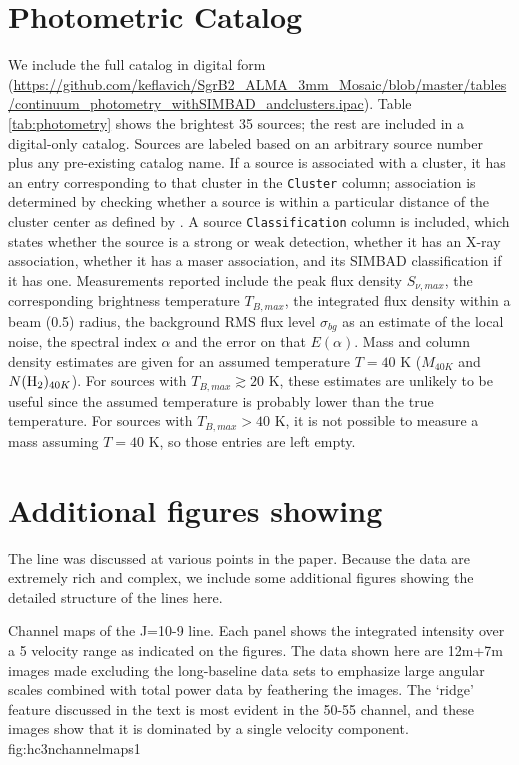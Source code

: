 \documentclass[twocolumn]{aastex61}
\begin{document}
\section{Photometric Catalog}
\label{sec:catalog}
We include the full catalog in digital form
(\url{https://github.com/keflavich/SgrB2_ALMA_3mm_Mosaic/blob/master/tables/continuum_photometry_withSIMBAD_andclusters.ipac}).
Table \ref{tab:photometry} shows
the brightest 35 sources; the rest are included in a digital-only catalog.
Sources are labeled based on an arbitrary source
number plus any pre-existing catalog name.  If a source is associated with a cluster,
it has an entry corresponding to that cluster in the \texttt{Cluster} column;
association is determined by checking whether a source is within a particular distance
of the cluster center as defined by \citet{Schmiedeke2016a}.  A source
\texttt{Classification} column is included, which states whether the source
is a strong or weak detection, whether it has an X-ray association, whether it
has a maser association, and its SIMBAD classification if it has one.
Measurements reported include the peak flux density $S_{\nu,max}$, the
corresponding brightness temperature $T_{B,max}$, the integrated flux density
within a beam (0.5\arcsec) radius, the background RMS flux level $\sigma_{bg}$
as an estimate of the local noise, the spectral index $\alpha$ and the error on
that $E(\alpha)$.  Mass and column density estimates are given for an assumed
temperature $T=40$ K ($M_{40K}$ and $N(\textrm{H}_{2})_{40K}$).  For sources with
$T_{B,max}\gtrsim20$ K, these estimates are unlikely to be useful since the
assumed temperature is probably lower than the true temperature.
For sources with $T_{B,max}>40$ K, it is not possible to measure a mass
assuming $T=40$ K, so those entries are left empty.



\section{Additional figures showing \cyanoacetylene}
\label{sec:hc3nfigures}
The \cyanoacetylene line was discussed at various points in the paper.  Because
the data are extremely rich and complex,  we include some additional figures
showing the detailed
structure of the lines here.

{Channel maps of the \cyanoacetylene J=10-9 line.  Each panel shows the integrated
intensity over a 5 \kms velocity range as indicated on the figures.
The data shown here are 
12m+7m images made excluding the long-baseline data sets to emphasize
large angular scales
combined with total power
data by feathering the images.
The `ridge' feature  discussed in the text is most evident in the 50-55 \kms
channel, and these images show that it is dominated by a single velocity
component.
}
{fig:hc3nchannelmaps}{1}{\textwidth}
\end{document}
